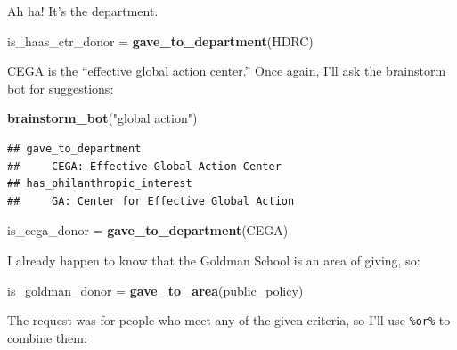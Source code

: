 \documentclass[]{book}
\newenvironment{Shaded}{\begin{snugshade}}{\end{snugshade}}
\newcommand{\KeywordTok}[1]{\textcolor[rgb]{0.13,0.29,0.53}{\textbf{#1}}}
\newcommand{\NormalTok}[1]{#1}
\newcommand{\OperatorTok}[1]{\textcolor[rgb]{0.81,0.36,0.00}{\textbf{#1}}}
\newcommand{\StringTok}[1]{\textcolor[rgb]{0.31,0.60,0.02}{#1}}
\begin{document}
Ah ha! It's the department.

\begin{Shaded}
\begin{Highlighting}[]
\NormalTok{is_haas_ctr_donor =}\StringTok{ }\KeywordTok{gave_to_department}\NormalTok{(HDRC)}
\end{Highlighting}
\end{Shaded}

CEGA is the ``effective global action center.'' Once again, I'll ask the brainstorm bot for suggestions:

\begin{Shaded}
\begin{Highlighting}[]
\KeywordTok{brainstorm_bot}\NormalTok{(}\StringTok{"global action"}\NormalTok{)}
\end{Highlighting}
\end{Shaded}

\begin{verbatim}
## gave_to_department 
##     CEGA: Effective Global Action Center
## has_philanthropic_interest 
##     GA: Center for Effective Global Action
\end{verbatim}

\begin{Shaded}
\begin{Highlighting}[]
\NormalTok{is_cega_donor =}\StringTok{ }\KeywordTok{gave_to_department}\NormalTok{(CEGA)}
\end{Highlighting}
\end{Shaded}

I already happen to know that the Goldman School is an area of giving, so:

\begin{Shaded}
\begin{Highlighting}[]
\NormalTok{is_goldman_donor =}\StringTok{ }\KeywordTok{gave_to_area}\NormalTok{(public_policy)}
\end{Highlighting}
\end{Shaded}

The request was for people who meet any of the given criteria, so I'll use \texttt{\%or\%} to combine them:

\begin{Shaded}
\end{Shaded}
\end{document}
